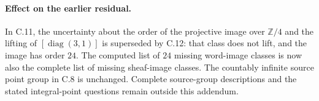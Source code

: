 \paragraph{Effect on the earlier residual.}
In C.11, the uncertainty about the order of the projective image
over $\mathbb Z/4$ and the lifting of
$[\operatorname{diag}(3,1)]$ is superseded by C.12:
that class does not lift, and the image has order $24$.
The computed list of $24$ missing word-image classes is now also
the complete list of missing sheaf-image classes.
The countably infinite source point group in C.8 is unchanged.
Complete source-group descriptions and the stated integral-point
questions remain outside this addendum.
